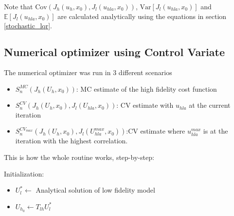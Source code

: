 \documentclass{article}
\begin{document}
Note that $\text{Cov}(J_h(u_h, x_0), J_l(u_{hla}, x_0))$, $\text{Var}[J_l(u_{hla}, x_0)]$ and $\mathbb{E}[J_l(u_{hla}, x_0)]$ are calculated analytically using the equations in section \ref{stochastic_lqr}.

\subsection{Numerical optimizer using Control Variate}

The numerical optimizer was run in 3 different scenarios

\begin{itemize}
  \item $S_n^{MC}(J_h(U_h, x_0))$: MC estimate of the high fidelity cost function
  \item $S_n^{CV}(J_h(U_h, x_0), J_l(U_{hla}, x_0))$: CV estimate with $u_{hla}$ at the current iteration
  \item $S_n^{CV_{max}}(J_h(U_h, x_0), J_l(U_{hla}^{max}, x_0))$:CV estimate where $u_{hla}^{max}$ is at the iteration with the highest correlation.
\end{itemize}

This is how the whole routine works, step-by-step:

Initialization:
\begin{itemize}
  \item $U_l^* \gets$ Analytical solution of low fidelity model
  \item $U_{h_0} \gets T_{lh} U_l^*$
\end{itemize}


\end{document}

